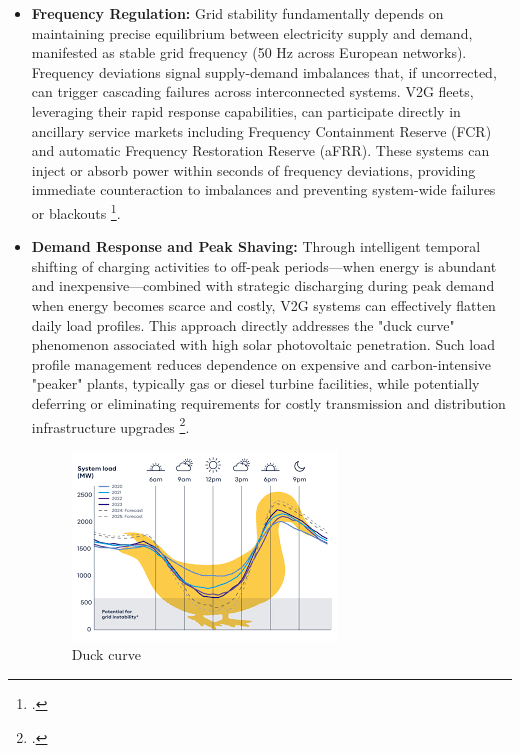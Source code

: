 \begin{itemize}
    \item \textbf{Frequency Regulation:} Grid stability fundamentally depends on maintaining precise equilibrium between electricity supply and demand, manifested as stable grid frequency (50 Hz across European networks). Frequency deviations signal supply-demand imbalances that, if uncorrected, can trigger cascading failures across interconnected systems. V2G fleets, leveraging their rapid response capabilities, can participate directly in ancillary service markets including Frequency Containment Reserve (FCR) and automatic Frequency Restoration Reserve (aFRR). These systems can inject or absorb power within seconds of frequency deviations, providing immediate counteraction to imbalances and preventing system-wide failures or blackouts \footcite{alfaverh2022optima, white2011vehicle}.
    
    \item \textbf{Demand Response and Peak Shaving:} Through intelligent temporal shifting of charging activities to off-peak periods—when energy is abundant and inexpensive—combined with strategic discharging during peak demand when energy becomes scarce and costly, V2G systems can effectively flatten daily load profiles. This approach directly addresses the "duck curve" phenomenon associated with high solar photovoltaic penetration. Such load profile management reduces dependence on expensive and carbon-intensive "peaker" plants, typically gas or diesel turbine facilities, while potentially deferring or eliminating requirements for costly transmission and distribution infrastructure upgrades \footcite{orfanoudakis2022deep, sadeghi2021deep}.
    \begin{figure}[H]
        \centering
        \includegraphics[width=0.75\linewidth]{duck.png}
        \caption{Duck curve}
        \label{fig:placeholder}
    \end{figure}
    

\end{itemize}
